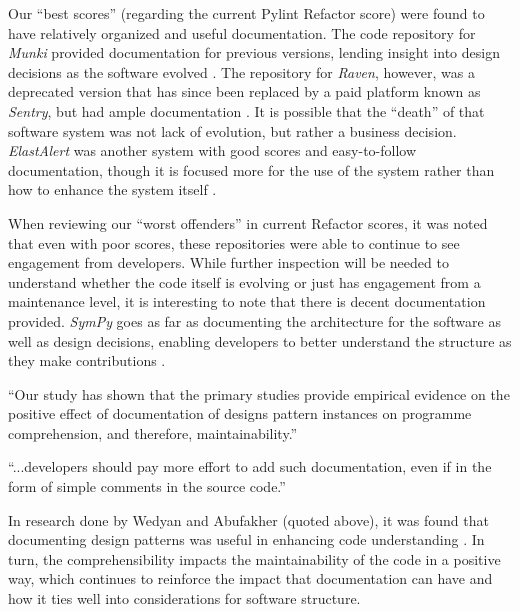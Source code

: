 Our ``best scores'' (regarding the current Pylint Refactor score) were found to have relatively organized and useful documentation. The code repository for \emph{Munki} provided documentation for previous versions, lending insight into design decisions as the software evolved \cite{data:munki}. The repository for \emph{Raven}, however, was a deprecated version that has since been replaced by a paid platform known as \emph{Sentry}, but had ample documentation \cite{data:raven-python}. It is possible that the ``death'' of that software system was not lack of evolution, but rather a business decision. \emph{ElastAlert} was another system with good scores and easy-to-follow documentation, though it is focused more for the use of the system rather than how to enhance the system itself \cite{data:elastalert}.

When reviewing our ``worst offenders'' in current Refactor scores, it was noted that even with poor scores, these repositories were able to continue to see engagement from developers. While further inspection will be needed to understand whether the code itself is evolving or just has engagement from a maintenance level, it is interesting to note that there is decent documentation provided. \emph{SymPy} goes as far as documenting the architecture for the software as well as design decisions, enabling developers to better understand the structure as they make contributions \cite{data:sympy-docs}.

\vspace{0.25cm}
\begin{displayquote}
``Our study has shown that the primary studies provide empirical evidence on the positive effect of documentation of designs pattern instances on programme comprehension, and therefore, maintainability.''
\end{displayquote}

\begin{displayquote}
``...developers should pay more effort to add such documentation, even if in the form of simple comments in the source code.''
\end{displayquote}
\vspace{0.25cm}

In research done by Wedyan and Abufakher (quoted above), it was found that documenting design patterns was useful in enhancing code understanding \cite{wedyan:2020}. In turn, the comprehensibility impacts the maintainability of the code in a positive way, which continues to reinforce the impact that documentation can have and how it ties well into considerations for software structure.
